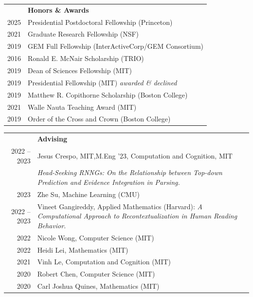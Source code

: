 \documentclass[letterpaper, 11pt]{article}
\newcommand{\headingfont}{\Large
\color{Black}}
\newcommand{\SectionHeading}[2][0pt]{ & {\headingfont\textbf{#2}}\\[#1] }
\newenvironment{SectionTableBase}[1]{%
\renewcommand{\arraystretch}{#1}%
\setlength{\tabcolsep}{10pt}%
\begin{longtable}{Rp{5.2in}} }{%
\end{longtable}
\vspace{-.3cm}
}
\newenvironment{SectionTableSingleSpace}{\begin{SectionTableBase}{1.2}}{\end{SectionTableBase}}
\newenvironment{SectionTableHalfSpace}{\begin{SectionTableBase}{0.9}}{\end{SectionTableBase}}
\begin{document}
\begin{SectionTableSingleSpace}
    \SectionHeading{Honors \& Awards}%
    2025 & Presidential Postdoctoral Fellowship (Princeton) \\%
    2021 & Graduate Research Fellowship (NSF) \\%
    2019 & GEM Full Fellowship (InterActiveCorp/GEM Consortium) \\%
    2016 & Ronald E. McNair Scholarship (TRIO) \\%
    2019 & Dean of Sciences Fellowship (MIT) \\%
    2019 & Presidential Fellowship (MIT)%
    \newline
    \textit{awarded \& declined} \\%
    2019 & Matthew R. Copithorne Scholarship (Boston College) \\%
    2021 & Walle Nauta Teaching Award (MIT) \\%
    2019 & Order of the Cross and Crown (Boston College) \\%
\end{SectionTableSingleSpace}


\begin{SectionTableHalfSpace}
    \SectionHeading{Advising} %
    2022 -- 2023 & Jesus Crespo, MIT,M.Eng '23, Computation and Cognition,
    MIT\\%
    &\textsl{Head-Seeking RNNGs: On the Relationship between Top-down Prediction
        and Evidence Integration in Parsing.} \\%
    2023 & Zhe Su, Machine Learning (CMU) \\%
    2022 -- 2023 & Vineet Gangireddy, Applied Mathematics (Harvard): \textsl{A
        Computational Approach to Recontextualization in Human Reading Behavior.}
    \\%
    2022 & Nicole Wong, Computer Science (MIT) \\ %
    2022 & Heidi Lei, Mathematics (MIT) \\%
    2021 & Vinh Le, Computation and Cognition (MIT) \\%
    2020 & Robert Chen, Computer Science (MIT) \\%
    2020 & Carl Joshua Quines, Mathematics (MIT)
\end{SectionTableHalfSpace}
\end{document}
